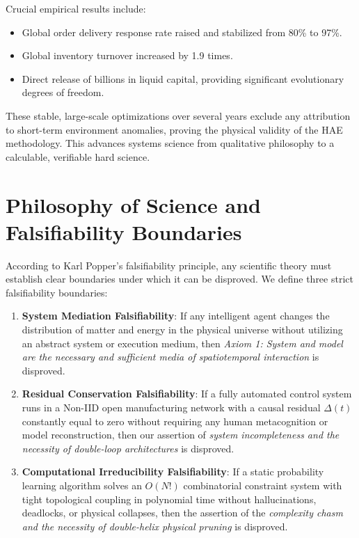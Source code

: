 \documentclass{article}
\begin{document}
Crucial empirical results include:
\textstyle
\begin{itemize}
    \item Global order delivery response rate raised and stabilized from 80\% to 97\%.
    \item Global inventory turnover increased by 1.9 times.
    \item Direct release of billions in liquid capital, providing significant evolutionary degrees of freedom.
\end{itemize}
These stable, large-scale optimizations over several years exclude any attribution to short-term environment anomalies, proving the physical validity of the HAE methodology. This advances systems science from qualitative philosophy to a calculable, verifiable hard science.

\section{Philosophy of Science and Falsifiability Boundaries}
\label{sec:philosophy-falsifiability}

According to Karl Popper's falsifiability principle, any scientific theory must establish clear boundaries under which it can be disproved. We define three strict falsifiability boundaries:
\begin{enumerate}
    \item \textbf{System Mediation Falsifiability}: If any intelligent agent changes the distribution of matter and energy in the physical universe without utilizing an abstract system or execution medium, then \emph{Axiom 1: System and model are the necessary and sufficient media of spatiotemporal interaction} is disproved.
    \item \textbf{Residual Conservation Falsifiability}: If a fully automated control system runs in a Non-IID open manufacturing network with a causal residual $\Delta(t)$ constantly equal to zero without requiring any human metacognition or model reconstruction, then our assertion of \emph{system incompleteness and the necessity of double-loop architectures} is disproved.
    \item \textbf{Computational Irreducibility Falsifiability}: If a static probability learning algorithm solves an $O(N!)$ combinatorial constraint system with tight topological coupling in polynomial time without hallucinations, deadlocks, or physical collapses, then the assertion of the \emph{complexity chasm and the necessity of double-helix physical pruning} is disproved.
\end{enumerate}
\end{document}
